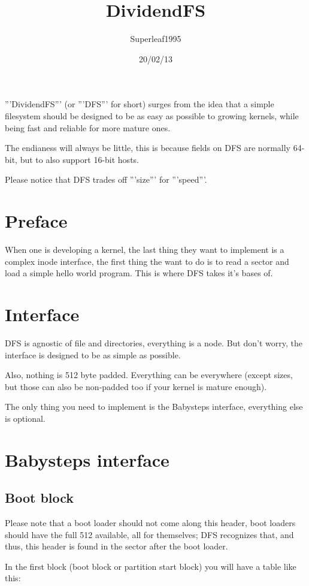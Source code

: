 \documentclass[12pt]{article}
\title{DividendFS}
\author{Superleaf1995}
\date{20/02/13}
\begin{document}
\maketitle

'''DividendFS''' (or '''DFS''' for short) surges from the idea that a simple filesystem should be designed to be as easy as possible to growing kernels, while being fast and reliable for more mature ones.

The endianess will always be little, this is because fields on DFS are normally 64-bit, but to also support 16-bit hosts.

Please notice that DFS trades off '''size''' for '''speed'''.

\section{Preface}
When one is developing a kernel, the last thing they want to implement is a complex inode interface, the first thing the want to do is to read a sector and load a simple hello world program.
This is where DFS takes it's bases of.

\section{Interface}
DFS is agnostic of file and directories, everything is a node. But don't worry, the interface is designed to be as simple as possible.

Also, nothing is 512 byte padded. Everything can be everywhere (except sizes, but those can also be non-padded too if your kernel is mature enough).

The only thing you need to implement is the Babysteps interface, everything else is optional.

\section{Babysteps interface}

\subsection{Boot block}

Please note that a boot loader should not come along this header, boot loaders should have the full 512 available, all for themselves; DFS recognizes that, and thus, this header is found in the sector after the boot loader.

In the first block (boot block or partition start block) you will have a table like this:
\end{document}
